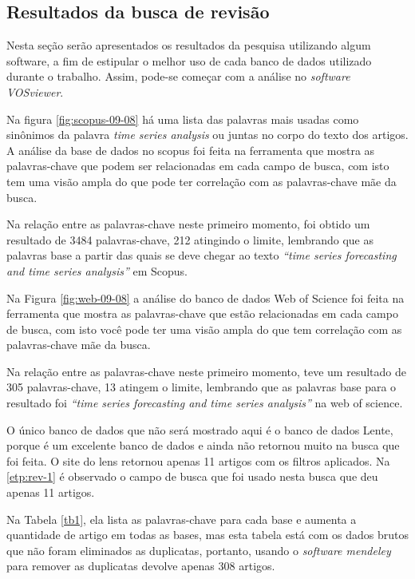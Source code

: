 \subsection{Resultados da busca de revis\~ao}\label{subesec:resul da revisão}


Nesta seção serão apresentados os resultados da pesquisa utilizando algum software, a fim de estipular o melhor uso de cada banco de dados utilizado durante o trabalho. Assim, pode-se começar com a análise no \textit{software VOSviewer}. 


Na figura \ref{fig:scopus-09-08} há uma lista das palavras mais usadas como sinônimos da palavra \textit{time series analysis} ou juntas no corpo do texto dos artigos.
A análise da base de dados no scopus foi feita na ferramenta que mostra as palavras-chave que podem ser relacionadas em cada campo de busca, com isto tem uma visão ampla do que pode ter correlação com as palavras-chave mãe da busca.

Na relação entre as palavras-chave neste primeiro momento, foi obtido um resultado de 3484 palavras-chave, 212 atingindo o limite, lembrando que as palavras base a partir das quais se deve chegar ao texto \textit{``time series forecasting and time series analysis''} em Scopus.






Na Figura \ref{fig:web-09-08} a análise do banco de dados Web of Science foi feita na ferramenta que mostra as palavras-chave que estão relacionadas em cada campo de busca, com isto você pode ter uma visão ampla do que tem correlação com as palavras-chave mãe da busca.

Na relação entre as palavras-chave neste primeiro momento, teve um resultado de 305 palavras-chave, 13 atingem o limite, lembrando que as palavras base para o resultado foi \textit{``time series forecasting and time series analysis''} na web of science.

O único banco de dados que não será mostrado aqui é o banco de dados Lente, porque é um excelente banco de dados e ainda não retornou muito na busca que foi feita. O site do lens retornou apenas 11 artigos com os filtros aplicados. Na \ref{etp:rev-1} é observado o campo de busca que foi usado nesta busca que deu apenas 11 artigos.






Na Tabela \ref{tb1}, ela lista as palavras-chave para cada base e aumenta a quantidade de artigo em todas as bases, mas esta tabela está com os dados brutos que não foram eliminados as duplicatas, portanto, usando o \textit{software mendeley} para remover as duplicatas devolve apenas 308 artigos.




